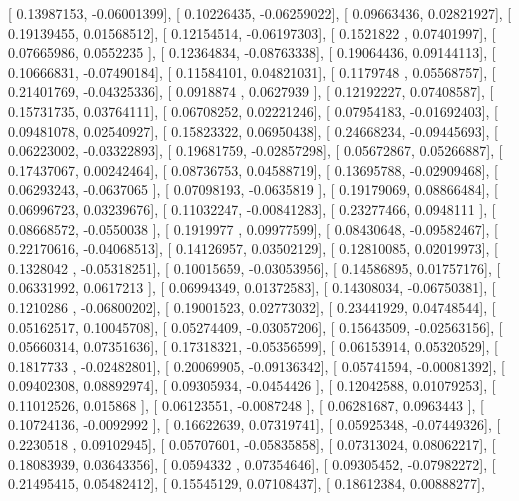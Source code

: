 \documentclass{article}
\begin{document}
       [ 0.13987153, -0.06001399],
       [ 0.10226435, -0.06259022],
       [ 0.09663436,  0.02821927],
       [ 0.19139455,  0.01568512],
       [ 0.12154514, -0.06197303],
       [ 0.1521822 ,  0.07401997],
       [ 0.07665986,  0.0552235 ],
       [ 0.12364834, -0.08763338],
       [ 0.19064436,  0.09144113],
       [ 0.10666831, -0.07490184],
       [ 0.11584101,  0.04821031],
       [ 0.1179748 ,  0.05568757],
       [ 0.21401769, -0.04325336],
       [ 0.0918874 ,  0.0627939 ],
       [ 0.12192227,  0.07408587],
       [ 0.15731735,  0.03764111],
       [ 0.06708252,  0.02221246],
       [ 0.07954183, -0.01692403],
       [ 0.09481078,  0.02540927],
       [ 0.15823322,  0.06950438],
       [ 0.24668234, -0.09445693],
       [ 0.06223002, -0.03322893],
       [ 0.19681759, -0.02857298],
       [ 0.05672867,  0.05266887],
       [ 0.17437067,  0.00242464],
       [ 0.08736753,  0.04588719],
       [ 0.13695788, -0.02909468],
       [ 0.06293243, -0.0637065 ],
       [ 0.07098193, -0.0635819 ],
       [ 0.19179069,  0.08866484],
       [ 0.06996723,  0.03239676],
       [ 0.11032247, -0.00841283],
       [ 0.23277466,  0.0948111 ],
       [ 0.08668572, -0.0550038 ],
       [ 0.1919977 ,  0.09977599],
       [ 0.08430648, -0.09582467],
       [ 0.22170616, -0.04068513],
       [ 0.14126957,  0.03502129],
       [ 0.12810085,  0.02019973],
       [ 0.1328042 , -0.05318251],
       [ 0.10015659, -0.03053956],
       [ 0.14586895,  0.01757176],
       [ 0.06331992,  0.0617213 ],
       [ 0.06994349,  0.01372583],
       [ 0.14308034, -0.06750381],
       [ 0.1210286 , -0.06800202],
       [ 0.19001523,  0.02773032],
       [ 0.23441929,  0.04748544],
       [ 0.05162517,  0.10045708],
       [ 0.05274409, -0.03057206],
       [ 0.15643509, -0.02563156],
       [ 0.05660314,  0.07351636],
       [ 0.17318321, -0.05356599],
       [ 0.06153914,  0.05320529],
       [ 0.1817733 , -0.02482801],
       [ 0.20069905, -0.09136342],
       [ 0.05741594, -0.00081392],
       [ 0.09402308,  0.08892974],
       [ 0.09305934, -0.0454426 ],
       [ 0.12042588,  0.01079253],
       [ 0.11012526,  0.015868  ],
       [ 0.06123551, -0.0087248 ],
       [ 0.06281687,  0.0963443 ],
       [ 0.10724136, -0.0092992 ],
       [ 0.16622639,  0.07319741],
       [ 0.05925348, -0.07449326],
       [ 0.2230518 ,  0.09102945],
       [ 0.05707601, -0.05835858],
       [ 0.07313024,  0.08062217],
       [ 0.18083939,  0.03643356],
       [ 0.0594332 ,  0.07354646],
       [ 0.09305452, -0.07982272],
       [ 0.21495415,  0.05482412],
       [ 0.15545129,  0.07108437],
       [ 0.18612384,  0.00888277],
\end{document}
